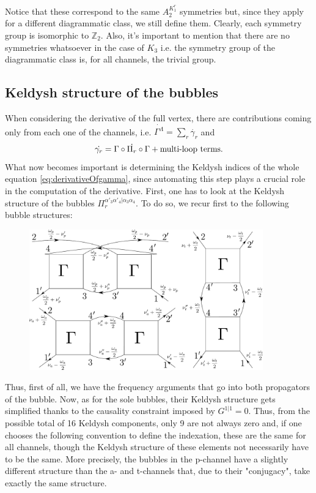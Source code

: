 \documentclass[12pt,a4paper,roman]{article}
\begin{document}
Notice that these correspond to the same $A_2^{K^r_1}$ symmetries but, since they apply for a different diagrammatic class, we still define them. Clearly, each symmetry group is isomorphic to $\mathbb{Z}_2$.
Also, it's important to mention that there are no symmetries whatsoever in the case of $K_3$ i.e. the symmetry group of the diagrammatic class is, for all channels, the trivial group.

\subsection*{Keldysh structure of the bubbles}
When considering the derivative of the full vertex, there are contributions coming only from each one of the channels, i.e. $\dot{\Gamma^{\Lambda}} = \sum_r \dot{\gamma_r}$  and
\begin{equation}
\centering
\dot{\gamma_r} = \Gamma \circ \dot{\Pi_r} \circ \Gamma + \text{multi-loop terms}.
\label{eq:derivativeOfgamma}
\end{equation}
What now becomes important is determining the Keldysh indices of the whole equation \ref{eq:derivativeOfgamma}, since automating this step plays a crucial role in the computation of the derivative.
First, one has to look at the Keldysh structure of the bubbles $\Pi_r^{\alpha'_3\alpha'_4|\alpha_3\alpha_4}$. To do so, we recur first to the following bubble structures:

\begin{figure}[H]
	\centering
	\includegraphics[width=0.9\textwidth]{all-Bubbles}
\end{figure}




Thus, first of all, we have the frequency arguments that go into both propagators of  the bubble.  Now, as for the sole bubbles, their Keldysh structure gets simplified thanks to the causality constraint imposed by $G^{1|1}=0$. Thus, from the possible total of 16 Keldysh components, only 9 are not always zero and, if one chooses the following convention to define the indexation, these are the same for all channels, though the Keldysh structure of these elements not necessarily have to be the same. More precisely, the bubbles in the p-channel have a slightly different structure than the a- and t-channels that, due to their "conjugacy", take exactly the same structure.
\end{document}
